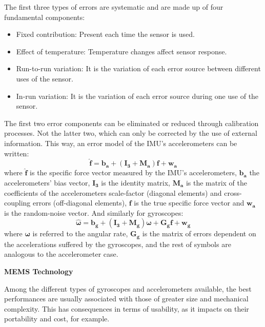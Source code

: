 \begin{description}
	The first three types of errors are systematic and are made up of four fundamental components:
	\begin{itemize}
		\item Fixed contribution: Present each time the sensor is used.
		\item Effect of temperature: Temperature changes affect sensor response.
		\item Run-to-run variation: It is the variation of each error source between different uses of the sensor.
		\item In-run variation: It is the variation of each error source during one use of the sensor.
	\end{itemize}
	The first two error components can be eliminated or reduced through calibration processes. 
	Not the latter two, which can only be corrected by the use of external information.	
	This way, an error model of the IMU's accelerometers can be written:
	\begin{equation}
	\label{eqn_acc_error}
		\boldsymbol{\hat{f}}=\boldsymbol{b_a}+(\boldsymbol{I_3}+\boldsymbol{M_a})\boldsymbol{f}+\boldsymbol{w_a}
	\end{equation}	
	where $\boldsymbol{\hat{f}}$ is the specific force vector measured by the IMU's accelerometers, $\boldsymbol{b_a}$ the accelerometers' bias vector, $\boldsymbol{I_3}$ is the identity matrix, $\boldsymbol{M_a}$ is the matrix of the coefficients of the accelerometers scale-factor (diagonal elements) and cross-coupling errors (off-diagonal elements), $\boldsymbol{f}$ is the true specific force vector and $\boldsymbol{w_a}$ is the random-noise vector.
	And similarly for gyroscopes:
	\begin{equation}
	\label{eqn_gyr_error}
		\boldsymbol{\hat{\omega}}=\boldsymbol{b_g}+(\boldsymbol{I_3}+\boldsymbol{M_g})\boldsymbol{\omega}+\boldsymbol{G_g}\boldsymbol{f}+\boldsymbol{w_g}
	\end{equation}		
	where $\boldsymbol{\omega}$ is referred to the angular rate, $\boldsymbol{G_g}$ is the matrix of errors dependent on the accelerations suffered by the gyroscopes, and the rest of symbols are analogous to the accelerometer case.
	\item \textbf{MEMS Technology}	
	
	Among the different types of gyroscopes and accelerometers available, the best performances are usually associated with those of greater size and mechanical complexity.
	This has consequences in terms of usability, as it impacts on their portability and cost, for example.
		

\end{description}
